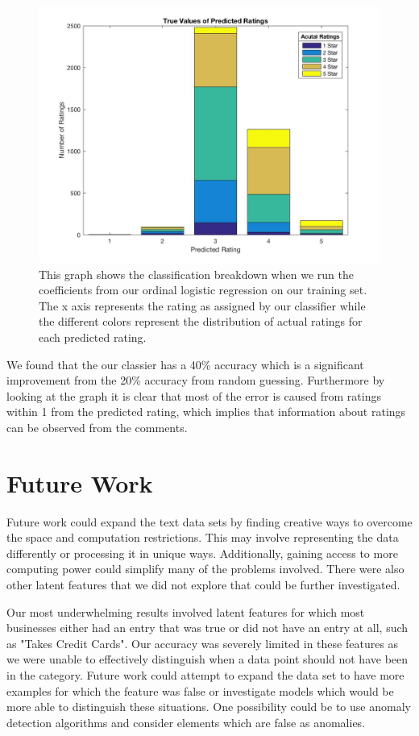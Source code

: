 \documentclass{article}
\begin{document}
\begin{figure}[!h]
\centering
\includegraphics[scale = .4]{../ord}
\caption{This graph shows the classification breakdown when we run the coefficients from our ordinal logistic regression on our training set. The x axis represents the rating as assigned by our classifier while the different colors represent the distribution of actual ratings for each predicted rating. }
\end{figure}

We found that the our classier has a 40\% accuracy which is a significant improvement from the 20\% accuracy from random guessing. Furthermore by looking at the graph it is clear that most of the error is caused from ratings within 1 from the predicted rating, which implies that information about ratings can be observed from the comments.   


\section{Future Work}

Future work could expand the text data sets by finding creative ways to overcome the space and computation restrictions.  This may involve representing the data differently or processing it in unique ways.  Additionally, gaining access to more computing power could simplify many of the problems involved.  There were also other latent features that we did not explore that could be further investigated.

Our most underwhelming results involved latent features for which most businesses either had an entry that was true or did not have an entry at all, such as "Takes Credit Cards".  Our accuracy was severely limited in these features as we were unable to effectively distinguish when a data point should not have been in the category.  Future work could attempt to expand the data set to have more examples for which the feature was false or investigate models which would be more able to distinguish these situations.  One possibility could be to use anomaly detection algorithms and consider elements which are false as anomalies.
\end{document}
